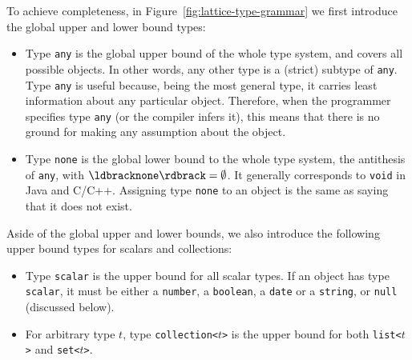 \documentclass[droidmono,libertine,twoside,user,unofficial]{ecarticle}
\newcommand{\denot}[1]{\ensuremath{\ldbrack#1\rdbrack}}
\begin{document}
To achieve completeness, in Figure~\ref{fig:lattice-type-grammar} we
first introduce the global upper and lower bound types:
\begin{itemize}
\item Type \texttt{any} is the global upper bound of the whole type
  system, and covers all possible objects.  In other words, any other
  type is a (strict) subtype of \texttt{any}.  Type \texttt{any} is
  useful because, being the most general type, it carries least
  information about any particular object.  Therefore, when the
  programmer specifies type \texttt{any} (or the compiler infers it),
  this means that there is no ground for making any assumption about
  the object.

\item Type \texttt{none} is the global lower bound to the whole type
  system, the antithesis of \texttt{any}, with
  $\denot{\texttt{none}}=\emptyset$.  It generally corresponds
  to \texttt{void} in Java and C/C++.  Assigning type \texttt{none} to
  an object is the same as saying that it does not exist.
\end{itemize}

Aside of the global upper and lower bounds, we also introduce the
following upper bound types for scalars and collections:
\begin{itemize}
\item Type \texttt{scalar} is the upper bound for all scalar types.
  If an object has type \texttt{scalar}, it must be either a
  \texttt{number}, a \texttt{boolean}, a \texttt{date} or a
  \texttt{string}, or \texttt{null} (discussed below).

\item For arbitrary type $t$, type \texttt{collection<$t$>} is the
  upper bound for both \texttt{list<$t$>} and \texttt{set<$t$>}.
\end{itemize}

\end{document}

